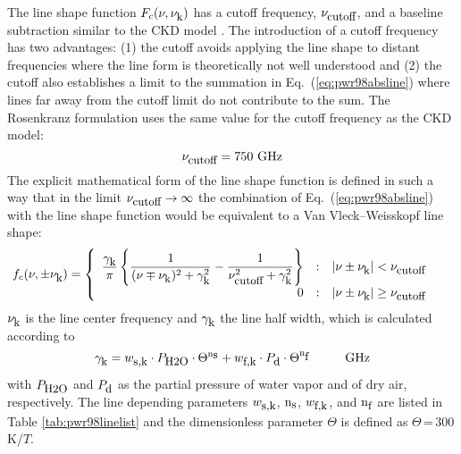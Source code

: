 {The line shape function $F_{c}(\nu,\nu_{\mbox{\rm \small k}})$ has a cutoff frequency, $\nu_{\mbox{\rm \small cutoff}}$,
and a baseline subtraction similar to the CKD model \cite{clough:89}.
The introduction of a cutoff frequency has two advantages: (1) the
cutoff avoids applying the line shape to distant frequencies where the 
line form is theoretically not well understood and (2) the cutoff also
establishes a limit to the summation in Eq.~(\ref{eq:pwr98absline}) where lines
far away from the cutoff limit do not contribute to the sum.  
The Rosenkranz formulation uses the same value for
the cutoff frequency as the CKD model:
\begin{equation} 
 \label{cutoff}
 \nu_{\mbox{\rm \small cutoff}} = 750\mbox{ GHz}
\end{equation}
%
The explicit mathematical form of the line shape function is defined 
in such a way that in the limit $\nu_{\mbox{\rm \small cutoff}} \rightarrow \infty$ the 
combination of Eq.~(\ref{eq:pwr98absline}) with the line shape function would 
be equivalent to a Van Vleck--Weisskopf \citep{vanvleck:45} line shape: 
\begin{equation}
 \label{eq:pwr98lineshape}
 \hspace*{-5mm}\shapefpm = 
   \left \{ \begin{array}{r@{\quad:\quad}l} 
   \displaystyle{\frac{\gamk}{\pi}} 
   \left \{ \displaystyle{\frac{1}{(\nu \mp \nuk)^2 + \gamk^2}} - 
   \displaystyle{\frac{1}{\nucut^2 + \gamk^2}} \right \}
   & |\nu \pm \nuk| < \nucut \\ 
   0 & |\nu \pm \nuk| \geq \nucut
                       \end{array} \right.
\end{equation}
$\nu_{\mbox{\rm \small k}}$ is the line center frequency and $\gamma_{\mbox{\rm \small k}}$ the line
half width, which is calculated according to 
\begin{equation}
 \label{eq:pwr98gamma}
 \gamk = \ws \cdot \phzo \cdot \Theta^{\xs} + 
         \wf \cdot \pda  \cdot \Theta^{\xf}\hspace*{10mm}\mbox{GHz}
\end{equation}
with $P_{\mbox{\rm \small H2O}}$ and $P_{\mbox{\rm \small d}}$ as the partial pressure of water vapor and of 
dry air, respectively. The line depending parameters $w_{\mbox{\rm \small s,k}}$, ${\rm n}_{\mbox{\rm \small s}}$, 
$w_{\mbox{\rm \small f,k}}$, and ${\rm n}_{\mbox{\rm \small f}}$ are listed in Table \ref{tab:pwr98linelist} and the 
dimensionless parameter $\Theta$ is defined as $\Theta$\,=\,300\,K/$T$.

}
